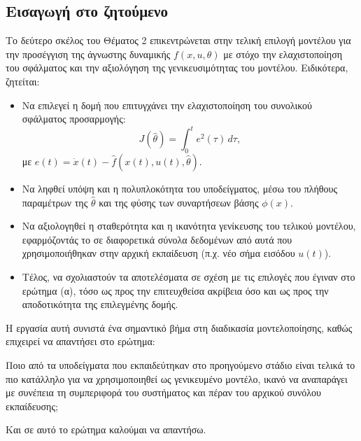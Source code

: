 \documentclass[a4paper,12pt]{report}
\begin{document}
\subsection{Εισαγωγή στο ζητούμενο}

Το δεύτερο σκέλος του Θέματος 2 επικεντρώνεται στην τελική επιλογή μοντέλου για την προσέγγιση της άγνωστης δυναμικής $f(x,u,\theta)$ με στόχο την ελαχιστοποίηση του σφάλματος και την αξιολόγηση της γενικευσιμότητας του μοντέλου. Ειδικότερα, ζητείται:

\begin{itemize}
    \item Να επιλεγεί η δομή που επιτυγχάνει την ελαχιστοποίηση του συνολικού σφάλματος προσαρμογής:
    \[
    J(\hat{\theta}) = \int_0^t e^2(\tau) \, d\tau,
    \]
    με $e(t) = \dot{x}(t) - \hat{f}(x(t), u(t), \hat{\theta})$.
    
    \item Να ληφθεί υπόψη και η πολυπλοκότητα του υποδείγματος, μέσω του πλήθους παραμέτρων της $\hat{\theta}$ και της φύσης των συναρτήσεων βάσης $\phi(x)$.

    \item Να αξιολογηθεί η σταθερότητα και η ικανότητα γενίκευσης του τελικού μοντέλου, εφαρμόζοντάς το σε διαφορετικά σύνολα δεδομένων από αυτά που χρησιμοποιήθηκαν στην αρχική εκπαίδευση (π.χ. νέο σήμα εισόδου $u(t)$).

    \item Τέλος, να σχολιαστούν τα αποτελέσματα σε σχέση με τις επιλογές που έγιναν στο ερώτημα (α), τόσο ως προς την επιτευχθείσα ακρίβεια όσο και ως προς την αποδοτικότητα της επιλεγμένης δομής.
\end{itemize}

\hspace{-0.6cm}Η εργασία αυτή συνιστά ένα σημαντικό βήμα στη διαδικασία μοντελοποίησης, καθώς επιχειρεί να απαντήσει στο ερώτημα: 

\vspace{0.15cm}

\hspace{-0.6cm}Ποιο από τα υποδείγματα που εκπαιδεύτηκαν στο προηγούμενο στάδιο είναι τελικά το πιο κατάλληλο για να χρησιμοποιηθεί ως γενικευμένο μοντέλο, ικανό να αναπαράγει με συνέπεια τη συμπεριφορά του συστήματος και πέραν του αρχικού συνόλου εκπαίδευσης;

\vspace{0.15cm}

\hspace{-0.6cm}Και σε αυτό το ερώτημα καλούμαι να απαντήσω.
\end{document}
